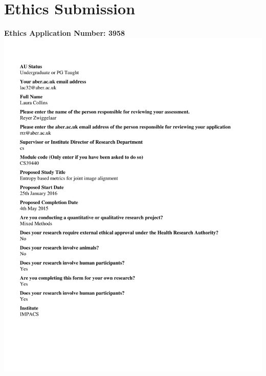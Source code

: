 
\thispagestyle{plain}

\chapter{Ethics Submission}
\label{appendix:ethics}


\textbf{Ethics Application Number: 3958}
  \includegraphics[scale = 0.4,clip,trim=10mm 25mm 25mm 18mm]{Appendix2/3958-1.png}
  \newpage
